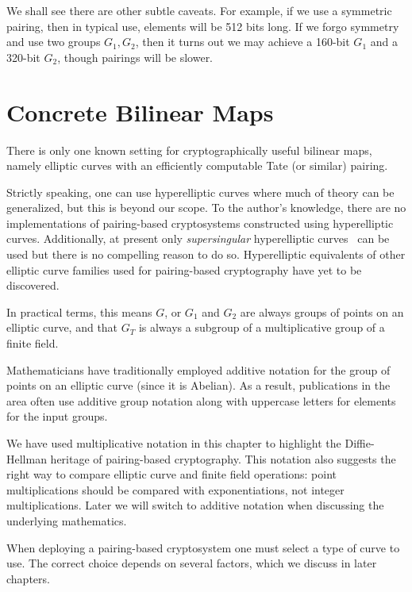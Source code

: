 We shall see there are other subtle caveats.
For example, if we use a symmetric pairing, then in typical use,
elements will be 512 bits long.
If we forgo symmetry and use two groups $G_1, G_2$,
then it turns out we may achieve a 160-bit $G_1$ and a 320-bit $G_2$,
though pairings will be slower.

\section{Concrete Bilinear Maps}

There is only one known setting for cryptographically useful bilinear maps,
namely elliptic curves with an efficiently computable
Tate (or similar) pairing.

Strictly speaking, one can use hyperelliptic
curves where much of theory can be generalized, but this is beyond
our scope. To the author's knowledge, there are no implementations
of pairing-based cryptosystems constructed using hyperelliptic curves.
Additionally, at present only \emph{supersingular} hyperelliptic
curves~\cite{galbraith,rubinsilverberg} can be used but there is no compelling
reason to do so.
Hyperelliptic equivalents of other elliptic curve families
used for pairing-based cryptography have yet to be discovered.

In practical terms, this means $G$, or $G_1$ and $G_2$ are always
groups of points on
an elliptic curve, and that $G_T$ is always a subgroup of a multiplicative group
of a finite field.

Mathematicians have traditionally employed additive notation for the
group of points on an elliptic curve (since it is
Abelian). As a result, publications in the area often use additive group
notation along with uppercase letters for elements for the input groups.

We have used multiplicative notation in this chapter to highlight the
Diffie-Hellman heritage of pairing-based cryptography. This notation also
suggests the right way to compare elliptic curve and finite field operations:
point multiplications should be compared with exponentiations, not
integer multiplications. Later we will switch to additive notation when
discussing the underlying mathematics.

When deploying a pairing-based cryptosystem one must select a type of
curve to use. The correct choice depends on several factors,
which we discuss in later chapters.

